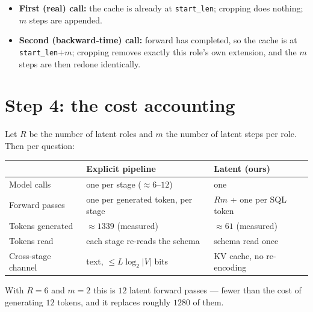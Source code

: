 \documentclass[11pt]{article}
\theoremstyle{definition}
\begin{document}
\begin{itemize}
\item \textbf{First (real) call:} the cache is already at \texttt{start\_len}; cropping does nothing; $m$ steps are appended.
\item \textbf{Second (backward-time) call:} forward has completed, so the cache is at \texttt{start\_len}$+m$; cropping removes exactly this role's own extension, and the $m$ steps are then redone identically.
\end{itemize}

\begin{center}
\end{center}

\section{Step 4: the cost accounting}

Let $R$ be the number of latent roles and $m$ the number of latent steps per role. Then per question:

\begin{center}
\begin{tabular}{lll}
\toprule
& \textbf{Explicit pipeline} & \textbf{Latent (ours)}\\
\midrule
Model calls           & one per stage ($\approx 6$--$12$) & one \\
Forward passes        & one per generated token, per stage & $Rm$ + one per SQL token \\
Tokens generated      & $\approx 1339$ (measured)          & $\approx 61$ (measured) \\
Tokens read           & each stage re-reads the schema     & schema read once \\
Cross-stage channel   & text, $\le L\log_2|V|$ bits        & KV cache, no re-encoding \\
\bottomrule
\end{tabular}
\end{center}

With $R = 6$ and $m = 2$ this is $12$ latent forward passes --- fewer than the cost of generating $12$ tokens, and it replaces roughly $1280$ of them.
\end{document}
